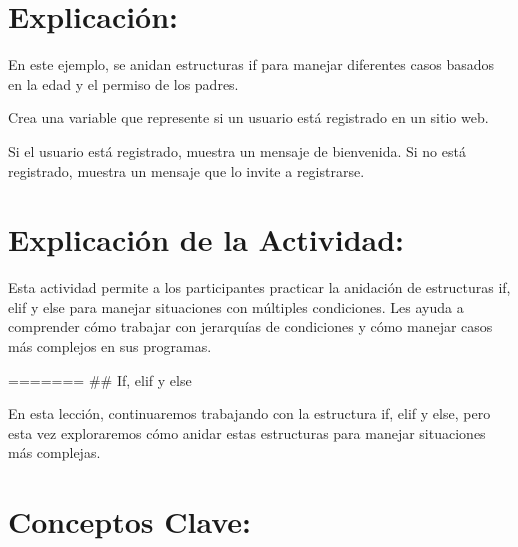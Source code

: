 \documentclass[
  a4paper,
  DIV=11,
  numbers=noendperiod,
  onepage,
  openany]{scrreprt}
\begin{document}
\hypertarget{explicaciuxf3n-32}{%
\section{Explicación:}\label{explicaciuxf3n-32}}

En este ejemplo, se anidan estructuras if para manejar diferentes casos
basados en la edad y el permiso de los padres.

\begin{tcolorbox}[enhanced jigsaw, colbacktitle=quarto-callout-important-color!10!white, toprule=.15mm, leftrule=.75mm, titlerule=0mm, opacityback=0, rightrule=.15mm, opacitybacktitle=0.6, breakable, left=2mm, coltitle=black, title=\textcolor{quarto-callout-important-color}{\faExclamation}\hspace{0.5em}{Actividad Práctica:}, toptitle=1mm, bottomtitle=1mm, arc=.35mm, bottomrule=.15mm, colback=white, colframe=quarto-callout-important-color-frame]

Crea una variable que represente si un usuario está registrado en un
sitio web.

Si el usuario está registrado, muestra un mensaje de bienvenida. Si no
está registrado, muestra un mensaje que lo invite a registrarse.

\end{tcolorbox}

\hypertarget{explicaciuxf3n-de-la-actividad-30}{%
\section{Explicación de la
Actividad:}\label{explicaciuxf3n-de-la-actividad-30}}

Esta actividad permite a los participantes practicar la anidación de
estructuras if, elif y else para manejar situaciones con múltiples
condiciones. Les ayuda a comprender cómo trabajar con jerarquías de
condiciones y cómo manejar casos más complejos en sus programas.

======= \#\# If, elif y else

En esta lección, continuaremos trabajando con la estructura if, elif y
else, pero esta vez exploraremos cómo anidar estas estructuras para
manejar situaciones más complejas.

\hypertarget{conceptos-clave-33}{%
\section{Conceptos Clave:}\label{conceptos-clave-33}}
\end{document}
